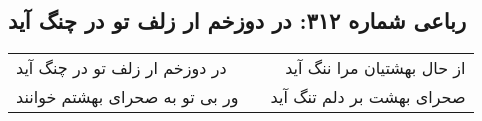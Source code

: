 \begin{center}
\section*{رباعی شماره ۳۱۲: در دوزخم ار زلف تو در چنگ آید}
\label{sec:sh312}
\begin{longtable}{l p{0.5cm} r}
در دوزخم ار زلف تو در چنگ آید
&&
از حال بهشتیان مرا ننگ آید
\\
ور بی تو به صحرای بهشتم خوانند
&&
صحرای بهشت بر دلم تنگ آید
\\
\end{longtable}
\end{center}
